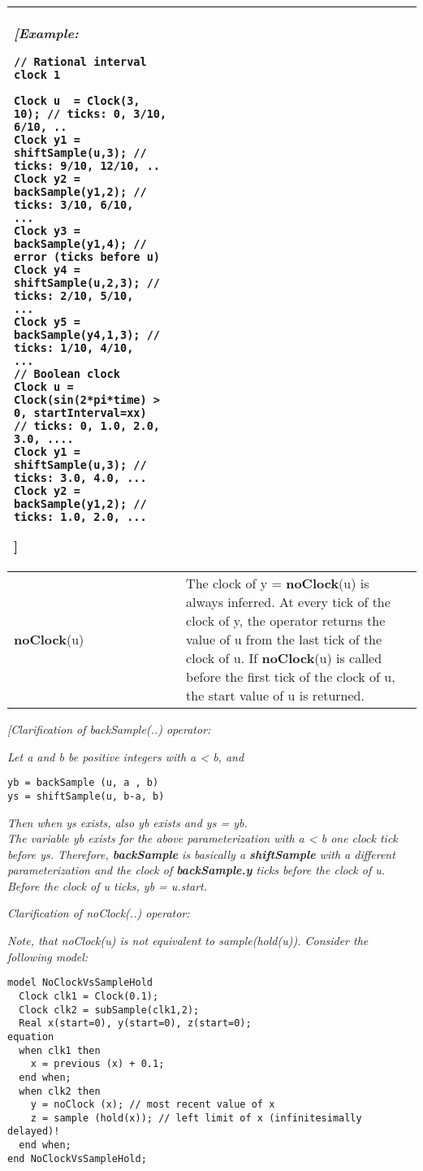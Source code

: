 \begin{longtable}[]{|p{4cm}|p{11cm}|}
\emph{{[}Example:}
\begin{lstlisting}[language=modelica]
// Rational interval clock 1

Clock u  = Clock(3, 10); // ticks: 0, 3/10, 6/10, ..
Clock y1 = shiftSample(u,3); // ticks: 9/10, 12/10, ..
Clock y2 = backSample(y1,2); // ticks: 3/10, 6/10,
...
Clock y3 = backSample(y1,4); // error (ticks before u)
Clock y4 = shiftSample(u,2,3); // ticks: 2/10, 5/10,
...
Clock y5 = backSample(y4,1,3); // ticks: 1/10, 4/10,
...
// Boolean clock
Clock u = Clock(sin(2*pi*time) > 0, startInterval=xx)
// ticks: 0, 1.0, 2.0, 3.0, ....
Clock y1 = shiftSample(u,3); // ticks: 3.0, 4.0, ...
Clock y2 = backSample(y1,2); // ticks: 1.0, 2.0, ...
\end{lstlisting}
{]}
\\ \hline
\textbf{noClock}(u)
&
The clock of y = \textbf{noClock}(u) is always inferred. At every tick
of the clock of y, the operator returns the value of u from the last
tick of the clock of u. If \textbf{noClock}(u) is called before the
first tick of the clock of u, the start value of u is returned.\\ \hline
\end{longtable}

\emph{{[}Clarification of backSample(..) operator:}

\emph{Let a and b be positive integers with a \textless{} b, and}
\begin{lstlisting}[language=modelica]
yb = backSample (u, a , b)
ys = shiftSample(u, b-a, b)
\end{lstlisting}
\emph{Then when ys exists, also yb exists and ys = yb.\\
The variable yb exists for the above parameterization with a \textless{}
b one clock tick before ys. Therefore, \textbf{backSample} is basically
a \textbf{shiftSample} with a different parameterization and the clock
of \textbf{backSample.y} ticks before the clock of u. Before the clock
of u ticks, yb = u.start.}

\emph{Clarification of noClock(..) operator:}

\emph{Note, that noClock(u) is not equivalent to sample(hold(u)).
Consider the following model:}

\begin{lstlisting}[language=modelica]
model NoClockVsSampleHold
  Clock clk1 = Clock(0.1);
  Clock clk2 = subSample(clk1,2);
  Real x(start=0), y(start=0), z(start=0);
equation
  when clk1 then
    x = previous (x) + 0.1;
  end when;
  when clk2 then
    y = noClock (x); // most recent value of x
    z = sample (hold(x)); // left limit of x (infinitesimally delayed)!
  end when;
end NoClockVsSampleHold;
\end{lstlisting}

